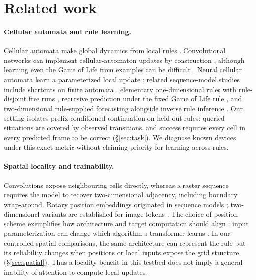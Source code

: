 \documentclass[11pt]{article}
\begin{document}
\appendix

\section{Related work}
\label{app:related}

\paragraph{Cellular automata and rule learning.}
Cellular automata make global dynamics from local rules
\citep{wolfram1983statistical, gardner1970fantastic}. Convolutional networks
can implement cellular-automaton updates by construction
\citep{gilpin2019cellular}, although learning even the Game of Life from
examples can be difficult \citep{springer2021hard}. Neural cellular automata
learn a parameterized local update \citep{mordvintsev2020growing}; related
sequence-model studies include shortcuts on finite automata
\citep{liu2023shortcuts}, elementary one-dimensional rules with
rule-disjoint free runs \citep{burtsev2024learning}, recursive prediction
under the fixed Game of Life rule \citep{berkovich2025lifegpt}, and
two-dimensional rule-supplied forecasting alongside inverse rule inference
\citep{berkovich2026automatagpt}. Our setting isolates prefix-conditioned
continuation on held-out rules: queried situations are covered by observed
transitions, and success requires every cell in every predicted frame to be
correct (\S\ref{sec:task}). We diagnose known devices under this exact metric
without claiming priority for learning across rules.

\paragraph{Spatial locality and trainability.}
Convolutions expose neighbouring cells directly, whereas a raster sequence
requires the model to recover two-dimensional adjacency, including boundary
wrap-around. Rotary position embeddings originated in sequence models
\citep{su2024roformer}; two-dimensional variants are established for image
tokens \citep{heo2024rotary}. The choice of position scheme exemplifies how
architecture and target computation should align \citep{battaglia2018relational,
xu2020reason, velickovic2020neural}; input parameterization can change which
algorithm a transformer learns \citep{mcleish2024arithmetic}. In our
controlled spatial comparisons, the same architecture can represent the rule
but its reliability changes when positions or local inputs expose the grid
structure (\S\ref{sec:spatial}). Thus a locality benefit in this testbed
does not imply a general inability of attention to compute local updates.
\end{document}
